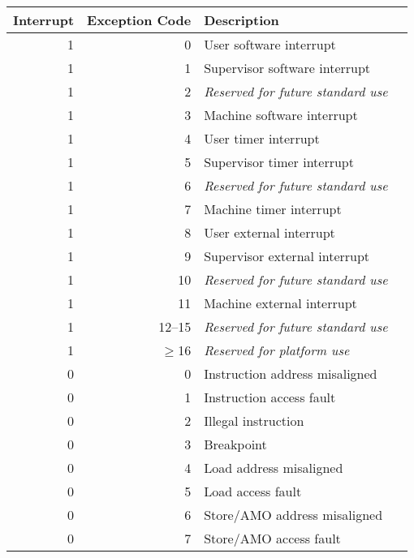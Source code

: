 \begin{table*}[h!]
\begin{center}
\begin{tabular}{|r|r|l|l|}

  \hline
  Interrupt & Exception Code  & Description \\
  \hline
  1         & 0               & User software interrupt \\
  1         & 1               & Supervisor software interrupt \\
  1         & 2               & {\em Reserved for future standard use} \\
  1         & 3               & Machine software interrupt \\ \hline
  1         & 4               & User timer interrupt \\
  1         & 5               & Supervisor timer interrupt \\
  1         & 6               & {\em Reserved for future standard use} \\
  1         & 7               & Machine timer interrupt \\ \hline
  1         & 8               & User external interrupt \\
  1         & 9               & Supervisor external interrupt \\
  1         & 10              & {\em Reserved for future standard use} \\
  1         & 11              & Machine external interrupt \\ \hline
  1         & 12--15          & {\em Reserved for future standard use} \\
  1         & $\ge$16         & {\em Reserved for platform use} \\ \hline
  0         & 0               & Instruction address misaligned \\
  0         & 1               & Instruction access fault \\
  0         & 2               & Illegal instruction \\
  0         & 3               & Breakpoint \\
  0         & 4               & Load address misaligned \\
  0         & 5               & Load access fault \\
  0         & 6               & Store/AMO address misaligned \\
  0         & 7               & Store/AMO access fault \\

\end{tabular}
\end{center}
\end{table*}
